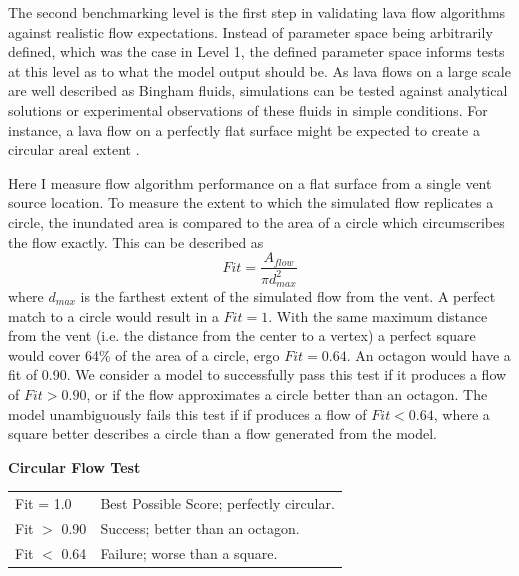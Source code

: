\documentclass[12pt,letter]{article}
\begin{document}
	The second benchmarking level is the first step in validating lava flow algorithms against realistic flow expectations. Instead of parameter space being arbitrarily defined, which was the case in Level 1, the defined parameter space informs tests at this level as to what the model output should be. As lava flows on a large scale are well described as Bingham fluids, simulations can be tested against analytical solutions or experimental observations of these fluids in simple conditions. For instance, a lava flow on a perfectly flat surface might be expected to create a circular areal extent \citep{griffiths2000dynamics}.
	
			Here I measure flow algorithm performance on a flat surface from a single vent source location. To measure the extent to which the simulated flow replicates a circle, the inundated area is compared to the area of a circle which circumscribes the flow exactly. This can be described as
			\begin{equation}
				Fit = \frac{A_{flow}}{\pi d_{max}^2}
			\end{equation}
			where $d_{max}$ is the farthest extent of the simulated flow from the vent. A perfect match to a circle would result in a $Fit=1$. With the same maximum distance from the vent (i.e. the distance from the center to a vertex) a perfect square would cover 64\% of the area of a circle, ergo $Fit=0.64$. An octagon would have a fit of 0.90. We consider a model to successfully pass this test if it produces a flow of $Fit>0.90$, or if the flow approximates a circle better than an octagon. The model unambiguously fails this test if if produces a flow of $Fit<0.64$, where a square better describes a circle than a flow generated from the model.

			\begin{center}
				\textbf{Circular Flow Test}
				
				\begin{tabular}{l l}
					\toprule
					Fit = 1.0 & Best Possible Score; perfectly circular.\\
					Fit $>$ 0.90 & Success; better than an octagon. \\
					Fit $<$ 0.64 & Failure; worse than a square.\\
					\bottomrule
				\end{tabular}
			\end{center}
		
\end{document}
